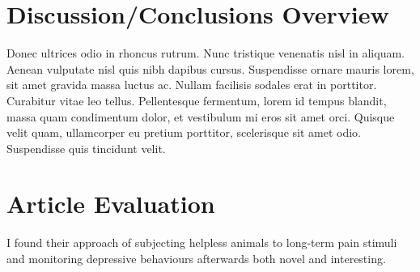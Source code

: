 \documentclass[
10pt, %
a4paper, %
twocolumn, %
landscape %
]{article}
\begin{document}

\section{Discussion/Conclusions Overview}

Donec ultrices odio in rhoncus rutrum. Nunc tristique venenatis nisl in aliquam. Aenean vulputate nisl quis nibh dapibus cursus. Suspendisse ornare mauris lorem, sit amet gravida massa luctus ac. Nullam facilisis sodales erat in porttitor. Curabitur vitae leo tellus. Pellentesque fermentum, lorem id tempus blandit, massa quam condimentum dolor, et vestibulum mi eros sit amet orci. Quisque velit quam, ullamcorper eu pretium porttitor, scelerisque sit amet odio. Suspendisse quis tincidunt velit.




\section*{Article Evaluation}

I found their approach of subjecting helpless animals to long-term pain stimuli and monitoring depressive behaviours afterwards both novel and interesting.


\renewcommand{\refname}{Reference} %


\end{document}
